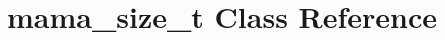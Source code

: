 \hypertarget{classmama__size__t}{
\section{mama\_\-size\_\-t Class Reference}
\label{classmama__size__t}
}

